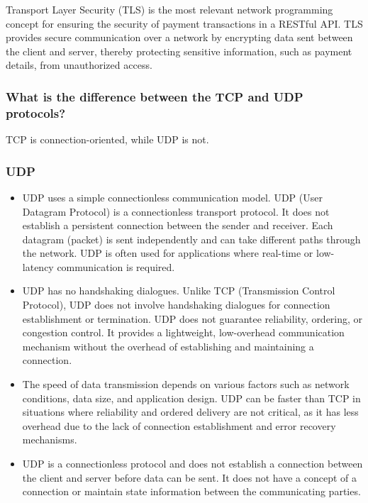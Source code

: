 Transport Layer Security (TLS) is the most relevant network programming concept for ensuring the security of payment transactions in a RESTful API. TLS provides secure communication over a network by encrypting data sent between the client and server, thereby protecting sensitive information, such as payment details, from unauthorized access.

\subsubsection{What is the difference between the TCP and UDP protocols?}
TCP is connection-oriented, while UDP is not.

\newpage
\subsubsection{UDP}
\begin{itemize}
\item UDP uses a simple connectionless communication model. UDP (User Datagram Protocol) is a connectionless transport protocol. It does not establish a persistent connection between the sender and receiver. Each datagram (packet) is sent independently and can take different paths through the network. UDP is often used for applications where real-time or low-latency communication is required.

\item UDP has no handshaking dialogues. Unlike TCP (Transmission Control Protocol), UDP does not involve handshaking dialogues for connection establishment or termination. UDP does not guarantee reliability, ordering, or congestion control. It provides a lightweight, low-overhead communication mechanism without the overhead of establishing and maintaining a connection.

\item The speed of data transmission depends on various factors such as network conditions, data size, and application design. UDP can be faster than TCP in situations where reliability and ordered delivery are not critical, as it has less overhead due to the lack of connection establishment and error recovery mechanisms.

\item UDP is a connectionless protocol and does not establish a connection between the client and server before data can be sent. It does not have a concept of a connection or maintain state information between the communicating parties.
\end{itemize}

